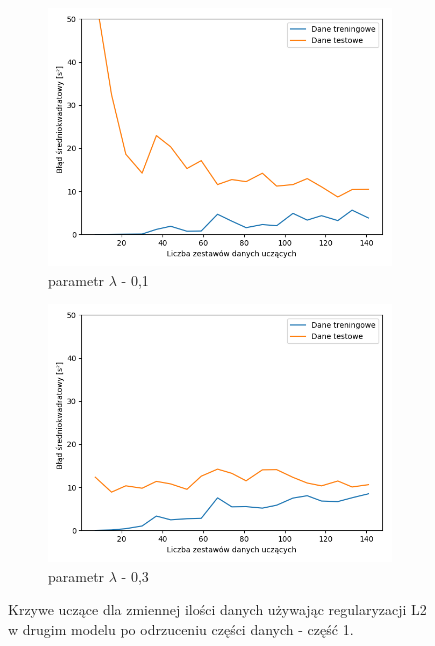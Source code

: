 \documentclass[12pt]{aghdpl}
\begin{document}
		\begin{figure}[h]
			\centering
		 	\begin{subfigure}{.8\linewidth}
		 		\includegraphics[width =\linewidth]{wykresy/7_badanie_danych/l2/regularyzacja_0_1_learning_curves.png}
		 		\caption{parametr $\lambda$ - 0,1}
		 	\end{subfigure}
		 	\begin{subfigure}{.8\linewidth}
		 		\includegraphics[width =\linewidth]{wykresy/7_badanie_danych/l2/regularyzacja_0_3_learning_curves.png}
		 		\caption{parametr $\lambda$ - 0,3}
		 	\end{subfigure}
		 	
		 	\caption{Krzywe uczące dla zmiennej ilości danych używając regularyzacji L2 w drugim modelu po odrzuceniu części danych - część 1.}
			\label{fig: drugi_model_przy_regularyzacji_l2_po_odrzuceniu_czesci_danych_learning_curves_1}
		\end{figure}
		
\end{document}
